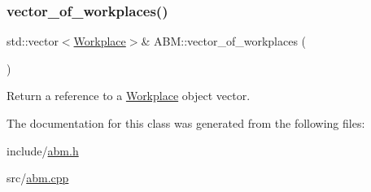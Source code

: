 \subsubsection{\texorpdfstring{vector\+\_\+of\+\_\+workplaces()}{vector\_of\_workplaces()}}
{\footnotesize\ttfamily std\+::vector$<$\hyperlink{classWorkplace}{Workplace}$>$\& A\+B\+M\+::vector\+\_\+of\+\_\+workplaces (\begin{DoxyParamCaption}{ }\end{DoxyParamCaption})\hspace{0.3cm}{\ttfamily [inline]}}



Return a reference to a \hyperlink{classWorkplace}{Workplace} object vector. 



The documentation for this class was generated from the following files\+:\begin{DoxyCompactItemize}
\item 
include/\hyperlink{abm_8h}{abm.\+h}\item 
src/\hyperlink{abm_8cpp}{abm.\+cpp}\end{DoxyCompactItemize}
